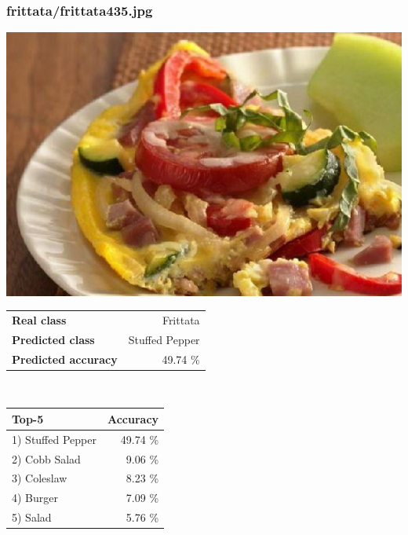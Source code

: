 \subsubsection{frittata/frittata435.jpg}

\begin{minipage}[t]{0.4\textwidth}
	\vspace{0pt}
	\includegraphics[width=\linewidth]{images/evaluation-images/frittata/frittata435.jpg}
\end{minipage}
\hfill
\begin{minipage}[t]{0.5\textwidth}
	\vspace{0pt}\raggedright
	\begin{tabularx}{\textwidth}{X r}
		\small \textbf{Real class} & \small Frittata\\
		\small \textbf{Predicted class} & \small Stuffed Pepper\\
		\small \textbf{Predicted accuracy} & \small 49.74 \%
    \end{tabularx}\\
    
    \vspace{6pt}
	\begin{tabularx}{\textwidth}{X r}
        \small \textbf{Top-5} & \small \textbf{Accuracy} \\
        \hline
		\small 1) Stuffed Pepper & \small 49.74 \%\\\small 2) Cobb Salad & \small 9.06 \%\\\small 3) Coleslaw & \small 8.23 \%\\\small 4) Burger & \small 7.09 \%\\\small 5) Salad & \small 5.76 \%
    \end{tabularx}
\end{minipage}
    

